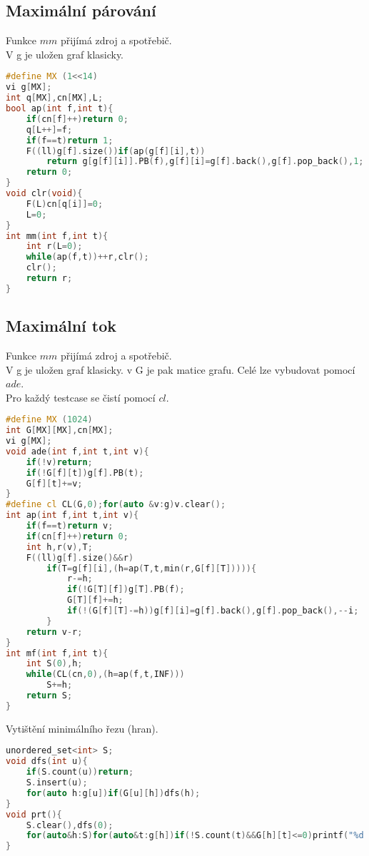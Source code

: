 \documentclass[11pt]{article}
\begin{document}
\subsection{Maximální párování}
Funkce $mm$ přijímá zdroj a spotřebič.
\\V \textsf{g} je uložen graf klasicky.
\begin{lstlisting}[language=C++]
#define MX (1<<14)
vi g[MX];
int q[MX],cn[MX],L;
bool ap(int f,int t){
    if(cn[f]++)return 0;
    q[L++]=f;
    if(f==t)return 1;
    F((ll)g[f].size())if(ap(g[f][i],t))
        return g[g[f][i]].PB(f),g[f][i]=g[f].back(),g[f].pop_back(),1;
    return 0;
}
void clr(void){
    F(L)cn[q[i]]=0;
    L=0;
}
int mm(int f,int t){
    int r(L=0);
    while(ap(f,t))++r,clr();
    clr();
    return r;
}
\end{lstlisting}
\subsection{Maximální tok}
Funkce $mm$ přijímá zdroj a spotřebič.
\\V \textsf{g} je uložen graf klasicky. v \textsf{G} je pak matice grafu. Celé lze vybudovat pomocí $ade$.
\\Pro každý testcase se čistí pomocí $cl$.
\begin{lstlisting}[language=C++]
#define MX (1024)
int G[MX][MX],cn[MX];
vi g[MX];
void ade(int f,int t,int v){
	if(!v)return;
    if(!G[f][t])g[f].PB(t);
    G[f][t]+=v;
}
#define cl CL(G,0);for(auto &v:g)v.clear();
int ap(int f,int t,int v){
    if(f==t)return v;
    if(cn[f]++)return 0;
    int h,r(v),T;
    F((ll)g[f].size()&&r)
        if(T=g[f][i],(h=ap(T,t,min(r,G[f][T])))){
            r-=h;
            if(!G[T][f])g[T].PB(f);
            G[T][f]+=h;
            if(!(G[f][T]-=h))g[f][i]=g[f].back(),g[f].pop_back(),--i;
        }
    return v-r;
}
int mf(int f,int t){
    int S(0),h;
    while(CL(cn,0),(h=ap(f,t,INF)))
        S+=h;
    return S;
}
\end{lstlisting}
Vytištění minimálního řezu (hran).
\begin{lstlisting}[language=C++]
unordered_set<int> S;
void dfs(int u){
    if(S.count(u))return;
    S.insert(u);
    for(auto h:g[u])if(G[u][h])dfs(h);
}
void prt(){
    S.clear(),dfs(0);
    for(auto&h:S)for(auto&t:g[h])if(!S.count(t)&&G[h][t]<=0)printf("%d %d\n",h+1,t+1);
}
\end{lstlisting}
\end{document}
